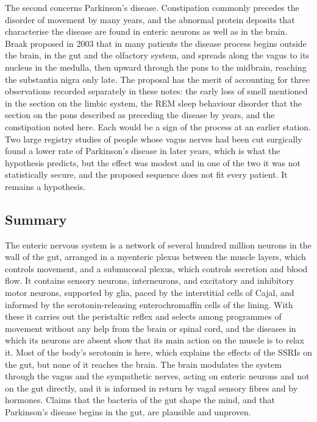\documentclass[11pt]{article}
\begin{document}
The second concerns Parkinson's disease. Constipation commonly precedes the disorder of movement by many years, and the abnormal protein deposits that characterise the disease are found in enteric neurons as well as in the brain. Braak proposed in 2003 that in many patients the disease process begins outside the brain, in the gut and the olfactory system, and spreads along the vagus to its nucleus in the medulla, then upward through the pons to the midbrain, reaching the substantia nigra only late. The proposal has the merit of accounting for three observations recorded separately in these notes: the early loss of smell mentioned in the section on the limbic system, the REM sleep behaviour disorder that the section on the pons described as preceding the disease by years, and the constipation noted here. Each would be a sign of the process at an earlier station. Two large registry studies of people whose vagus nerves had been cut surgically found a lower rate of Parkinson's disease in later years, which is what the hypothesis predicts, but the effect was modest and in one of the two it was not statistically secure, and the proposed sequence does not fit every patient. It remains a hypothesis.

\subsection{Summary}

The enteric nervous system is a network of several hundred million neurons in the wall of the gut, arranged in a myenteric plexus between the muscle layers, which controls movement, and a submucosal plexus, which controls secretion and blood flow. It contains sensory neurons, interneurons, and excitatory and inhibitory motor neurons, supported by glia, paced by the interstitial cells of Cajal, and informed by the serotonin-releasing enterochromaffin cells of the lining. With these it carries out the peristaltic reflex and selects among programmes of movement without any help from the brain or spinal cord, and the diseases in which its neurons are absent show that its main action on the muscle is to relax it. Most of the body's serotonin is here, which explains the effects of the SSRIs on the gut, but none of it reaches the brain. The brain modulates the system through the vagus and the sympathetic nerves, acting on enteric neurons and not on the gut directly, and it is informed in return by vagal sensory fibres and by hormones. Claims that the bacteria of the gut shape the mind, and that Parkinson's disease begins in the gut, are plausible and unproven.
\end{document}
